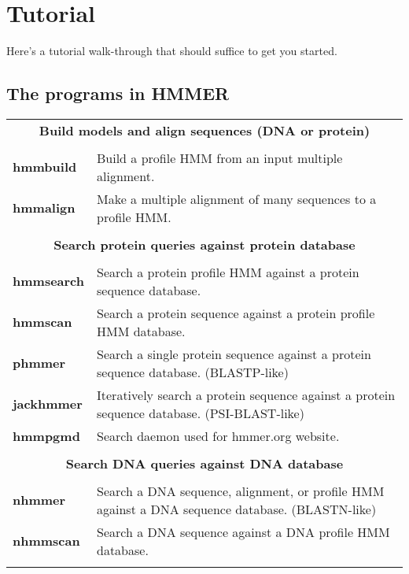 
\section{Tutorial}
\label{section:tutorial}
\setcounter{footnote}{0}

Here's a tutorial walk-through that should suffice to get you started.

\subsection {The programs in HMMER}

\begin{tabular}{ll}

\multicolumn{2}{c}{\textbf{Build models and align sequences (DNA or protein)}}
\\ & \\ 
\textbf{hmmbuild}  & Build a profile HMM from an input multiple alignment.\\  
\textbf{hmmalign}  & Make a multiple alignment of many sequences to a profile HMM.\\ 
& \\

\multicolumn{2}{c}{\textbf{Search protein queries against protein database}} \\ 
& \\ 
\textbf{hmmsearch} & Search a protein profile HMM against a protein sequence database.\\ 
\textbf{hmmscan}   & Search a protein sequence against a protein profile HMM database.\\
\textbf{phmmer}    & Search a single protein sequence against a protein sequence database. (BLASTP-like) \\
\textbf{jackhmmer} & Iteratively search a protein sequence against a protein sequence database. (PSI-BLAST-like) \\ 
\textbf{hmmpgmd}   & Search daemon used for hmmer.org website.\\ 
& \\ 

\multicolumn{2}{c}{\textbf{Search DNA queries against DNA database}} \\ 
& \\ 
\textbf{nhmmer}    & Search a DNA sequence, alignment, or profile HMM against a DNA sequence database. (BLASTN-like)\\ 
\textbf{nhmmscan}  & Search a DNA sequence against a DNA profile HMM database.\\ 
& \\


\end{tabular}
